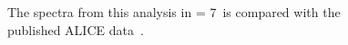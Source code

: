 \documentclass[ALICE,manyauthors]{ALICE_internal_notes}
\begin{document}
\begin{figure}[p]
  \caption{The spectra from this analysis in \pp{} \s = 7\tev\  is compared with the published ALICE data~\cite{Abelev:2013ala}.
 }
  \label{fig:spectra_7tev}
\end{figure}

\label{sec:spectra}


\clearpage
\newpage
\end{document}
